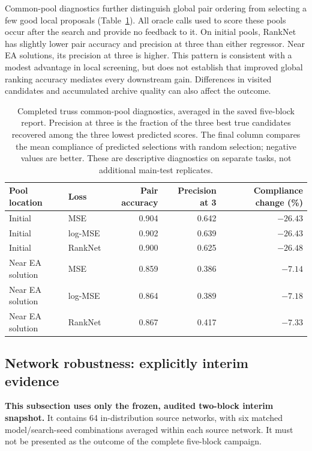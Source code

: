 \documentclass[11pt,a4paper]{article}
\begin{document}
Common-pool diagnostics further distinguish global pair ordering from selecting a few good local proposals (Table~\ref{tab:pools}). All oracle calls used to score these pools occur after the search and provide no feedback to it. On initial pools, RankNet has slightly lower pair accuracy and precision at three than either regressor. Near EA solutions, its precision at three is higher. This pattern is consistent with a modest advantage in local screening, but does not establish that improved global ranking accuracy mediates every downstream gain. Differences in visited candidates and accumulated archive quality can also affect the outcome.
\begin{table}[tb]
\centering\small
\caption{Completed truss common-pool diagnostics, averaged in the saved five-block report. Precision at three is the fraction of the three best true candidates recovered among the three lowest predicted scores. The final column compares the mean compliance of predicted selections with random selection; negative values are better. These are descriptive diagnostics on separate tasks, not additional main-test replicates.}
\label{tab:pools}
\begin{tabular}{llrrr}\toprule
Pool location & Loss & Pair accuracy & Precision at 3 & Compliance change (\%)\\\midrule
Initial & MSE & 0.904 & 0.642 & $-26.43$\\
Initial & log-MSE & 0.902 & 0.639 & $-26.43$\\
Initial & RankNet & 0.900 & 0.625 & $-26.48$\\
Near EA solution & MSE & 0.859 & 0.386 & $-7.14$\\
Near EA solution & log-MSE & 0.864 & 0.389 & $-7.18$\\
Near EA solution & RankNet & 0.867 & 0.417 & $-7.33$\\\bottomrule
\end{tabular}
\end{table}

\subsection{Network robustness: explicitly interim evidence}
\textbf{This subsection uses only the frozen, audited two-block interim snapshot.} It contains 64 in-distribution source networks, with six matched model/search-seed combinations averaged within each source network. It must not be presented as the outcome of the complete five-block campaign.
\end{document}
